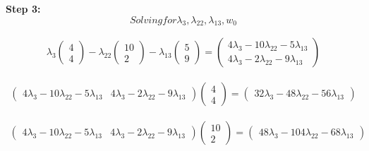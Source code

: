 \documentclass[12pt]{report}
\begin{document}
\textbf{Step 3:}
\begin{equation*}
	Solving for \lambda_{3}, \lambda_{22}, \lambda_{13}, w_{0}
\end{equation*}


\begin{equation*}
	\begin{aligned}
		\lambda_{3}\begin{pmatrix}4 \\ 4\end{pmatrix}-\lambda_{22}\begin{pmatrix}10\\ 2\end{pmatrix}-\lambda_{13}\begin{pmatrix}5\\ 9\end{pmatrix}=\begin{pmatrix}4\lambda_{3}-10\lambda_{22}-5\lambda_{13}\\ 4\lambda_{3}-2\lambda_{22}-9\lambda_{13}\end{pmatrix}
	\end{aligned}
\end{equation*}

\begin{equation}
	\begin{aligned}
		\begin{pmatrix}4\lambda_{3}-10\lambda_{22}-5\lambda_{13} & 4\lambda_{3}-2\lambda_{22}-9\lambda_{13}\end{pmatrix}\begin{pmatrix}4 \\ 4\end{pmatrix}=\begin{pmatrix}32\lambda_{3}-48\lambda_{22}-56\lambda_{13}\end{pmatrix}
	\end{aligned}
\end{equation}

\begin{equation}
	\begin{aligned}
		\begin{pmatrix}4\lambda_{3}-10\lambda_{22}-5\lambda_{13} & 4\lambda_{3}-2\lambda_{22}-9\lambda_{13}\end{pmatrix}\begin{pmatrix}10 \\ 2\end{pmatrix}=\begin{pmatrix}48\lambda_{3}-104\lambda_{22}-68\lambda_{13}\end{pmatrix}
	\end{aligned}
\end{equation}
\end{document}
